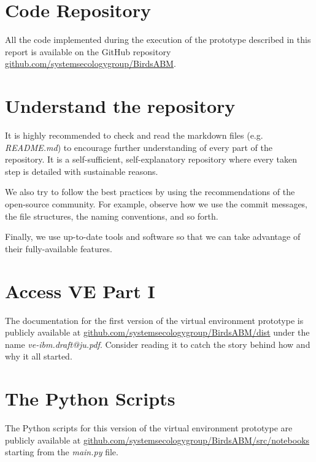 %
%
%


\clearpage
\appendix
\begin{appendices}
    \section{Code Repository}\label{sec:code-repo}
    All the code implemented during the execution of the prototype described in this report is available on the GitHub repository \href{https://github.com/systemsecologygroup/BirdsABM}{github.com/systemsecologygroup/BirdsABM}.

    \section{Understand the repository}\label{sec:understand-repo}
    It is highly recommended to check and read the markdown files (e.g. \emph{README.md}) to encourage further understanding of every part of the repository. It is a self-sufficient, self-explanatory repository where every taken step is detailed with sustainable reasons.

    We also try to follow the best practices by using the recommendations of the open-source community. For example, observe how we use the commit messages, the file structures, the naming conventions, and so forth.

    Finally, we use up-to-date tools and software so that we can take advantage
    of their fully-available features.

    \section{Access VE Part I}\label{sec:access-ve1}
    The documentation for the first version of the virtual environment prototype is publicly available at \href{https://github.com/systemsecologygroup/BirdsABM/dist}{github.com/systemsecologygroup/BirdsABM/dist} under the name \emph{ve-ibm.draft@ju.pdf}. Consider reading it to catch the story behind how and why it all started.

    \section{The Python Scripts}\label{sec:python-scripts}
    The Python scripts for this version of the virtual environment prototype are publicly available at \href{https://github.com/systemsecologygroup/BirdsABM/src/notebooks}{github.com/systemsecologygroup/BirdsABM/src/notebooks} starting from the \emph{main.py} file.
\end{appendices}
